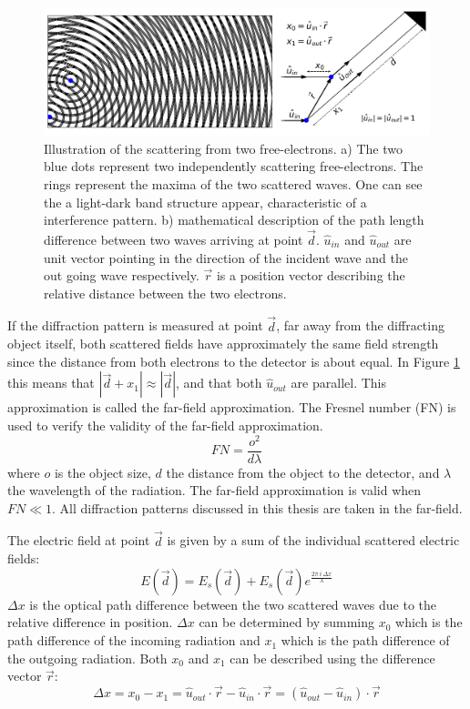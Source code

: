 \begin{figure}[h]
\centering 
\includegraphics[width=120mm]{Chapter_02_InterferenceTwoElectrons.png}
\caption{Illustration of the scattering from two free-electrons. a) The two blue dots represent two independently scattering free-electrons. The rings represent the maxima of the two scattered waves. One can see the a light-dark band structure appear, characteristic of a interference pattern. b) mathematical description of the path length difference between two waves arriving at point $\vec{d}$. $\hat{u}_{in}$ and $\hat{u}_{out}$ are unit vector pointing in the direction of the incident wave and the out going wave respectively. $\vec{r}$ is a position vector describing the relative distance between the two electrons. }\label{fig:Interference}

\end{figure}

If the diffraction pattern is measured at point \(\vec{d}\), far away from the diffracting object itself, both scattered fields have approximately the same field strength since the distance from both electrons to the detector is about equal. In Figure \ref{fig:Interference} this means that  $|\vec{d}+x_1| \approx |\vec{d}|$, and that both $\hat{u}_{out}$ are parallel. This approximation is called the far-field approximation. The Fresnel number (FN) is used to verify the validity of the far-field approximation.
\begin{equation} 
FN = \frac{o^2}{d\lambda}
\end{equation}
where $o$ is the object size, $d$ the distance from the
object to the detector, and \(\lambda\) the
wavelength of the radiation. The far-field approximation is valid when $FN \ll 1$. All diffraction patterns discussed
in this thesis are taken in the far-field. 

The electric field at point $\vec{d}$ is given by a sum of the individual scattered electric fields:
\begin{equation}
E(\vec{d}) = E_s(\vec{d})+E_s(\vec{d}) e^{\frac{2 \pi\,i\,\Delta x}{\lambda}} 	 
\end{equation}
$\Delta x$ is the optical path difference between the two scattered waves due to the relative difference in position. $\Delta x$ can be determined by summing $x_0$ which is the path difference of the incoming radiation and $x_1$ which is the path difference of the outgoing radiation. Both $x_0$ and $x_1$ can be described using the difference vector $\vec{r}$: 
\begin{equation}
\Delta x = x_0 - x_1 =\hat{u}_{out} \cdot \vec{r}-\hat{u}_{in}\cdot \vec{r} = (\hat{u}_{out} -\hat{u}_{in} ) \cdot \vec{r} 
\end{equation}

